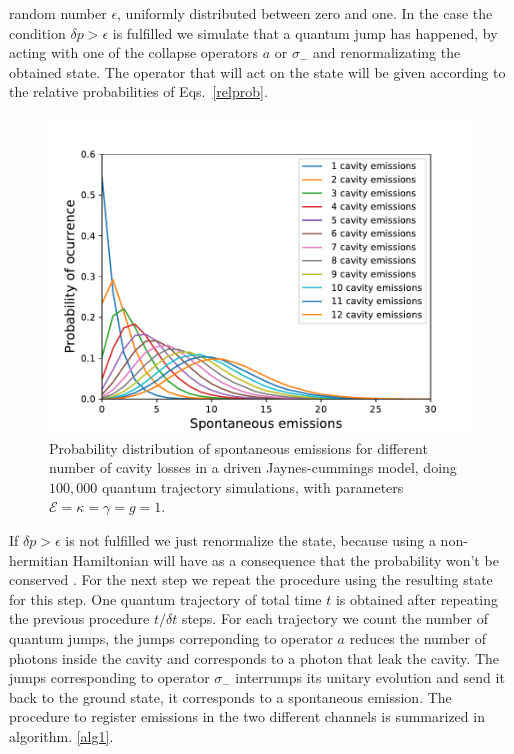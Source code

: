 \documentclass[%
 reprint,
 amsmath,amssymb,
 aps, 
]{revtex4-2}
\begin{document}
random number $\epsilon$, uniformly distributed between zero and one.
In the case the condition $\delta p > \epsilon$ is fulfilled we
simulate that a quantum jump has happened, by acting with one of the
collapse operators $a$ or $\sigma_-$ and renormalizating the obtained
state. The operator that will act on the state will be given according
to the relative probabilities of Eqs.~\eqref{relprob}.
\begin{figure}[!t] 
\centering
\includegraphics[scale = 0.5]{distributioneng.pdf}
\caption{\small{Probability distribution of spontaneous emissions for different number of cavity losses in a driven Jaynes-cummings model, doing $100,000$ quantum trajectory simulations, with parameters $\mathcal{E}  = \kappa = \gamma = g = 1$.}} \label{probdiss}
\end{figure}
If $\delta p > \epsilon$ is not fulfilled we just renormalize the
state, because using a non-hermitian Hamiltonian will have as a
consequence that the probability won't be conserved
\cite{Sakurai:1167961}. For the next step we repeat the procedure
using the resulting state for this step. One quantum trajectory of
total time $t$ is obtained after repeating the previous procedure
$t/\delta t$ steps. For each trajectory we count the number of quantum
jumps, the jumps correponding to operator $a$ reduces the number of
photons inside the cavity and corresponds to a photon that leak the
cavity. The jumps corresponding to operator $\sigma_-$ interrumps its
unitary evolution and send it back to the ground state, it corresponds
to a spontaneous emission. The procedure to register emissions in the
two different channels is summarized in algorithm. \ref{alg1}.
\end{document}
